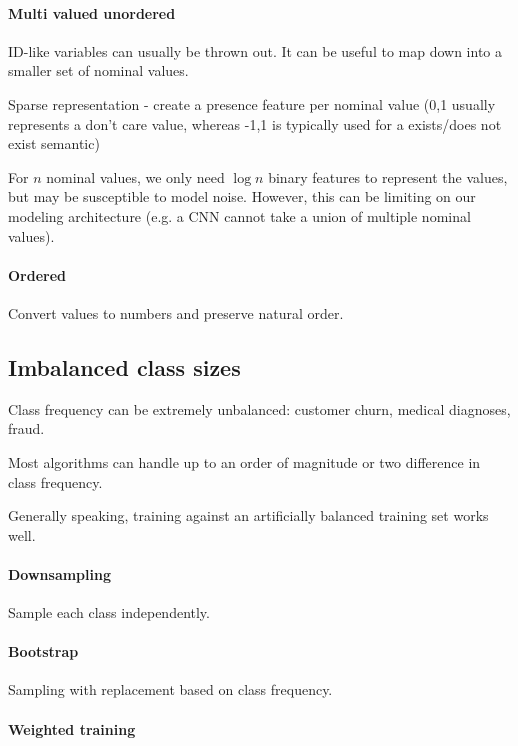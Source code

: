 \documentclass{idc_msc}
\begin{document}
\paragraph{Multi valued unordered}

ID-like variables can usually be thrown out.
It can be useful to map down into a smaller set of nominal values.

Sparse representation - create a presence feature per nominal value (0,1 usually represents a don't care value, whereas -1,1 is typically used for a exists/does not exist semantic)

For \(n\) nominal values, we only need \(\log n\) binary features to represent the values, but may be susceptible to model noise. However, this can be limiting on our modeling architecture (e.g. a CNN cannot take a union of multiple nominal values).

\paragraph{Ordered}

Convert values to numbers and preserve natural order.

\subsection{Imbalanced class sizes}

Class frequency can be extremely unbalanced: customer churn, medical diagnoses, fraud.

Most algorithms can handle up to an order of magnitude or two difference in class frequency.

Generally speaking, training against an artificially balanced training set works well.

\paragraph{Downsampling}

Sample each class independently.

\paragraph{Bootstrap}

Sampling with replacement based on class frequency.

\paragraph{Weighted training}
\end{document}
